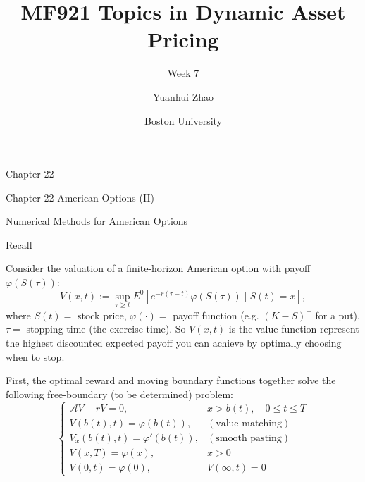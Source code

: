 \documentclass{beamer}
\title{MF921 Topics in Dynamic Asset Pricing}
\subtitle{Week 7}
\author{Yuanhui Zhao}
\date{Boston University}
\begin{document}
\frame{\titlepage}

\begin{frame}{Chapter 22}

    {
    \begin{center}
        Chapter 22 American Options (II)
    \end{center}
    \begin{center}
        Numerical Methods for American Options
    \end{center}
    }
    
\end{frame}

\begin{frame}{Recall}

    {\footnotesize \footnotesize
    Consider the valuation of a finite-horizon American option with payoff $\varphi(S(\tau))$:
    \[
    V(x,t) := \sup_{\tau \geq t} E^0 \left[ e^{-r(\tau - t)} \varphi(S(\tau)) \mid S(t) = x \right],
    \]
     where \( S(t) = \) stock price, \(\varphi(\cdot) = \) payoff function (e.g. \((K - S)^+\) for 
    a put), \(\tau = \) stopping time (the exercise time). So \( V(x,t) \) is the value function
    represent the highest discounted expected payoff you can achieve by optimally choosing when to stop.
    \vspace{1em}

    First, the optimal reward and moving boundary functions together solve the
    following free-boundary (to be determined) problem:
        \[
        \begin{cases}
        \mathcal{A} V - rV = 0, & x > b(t), \quad 0 \leq t \leq T\\
        V(b(t), t) = \varphi(b(t)), & (\text{value matching}) \\
        V_x(b(t), t) = \varphi'(b(t)), & (\text{smooth pasting}) \\
        V(x, T) = \varphi(x), & x > 0 \\
        V(0, t) = \varphi(0), & V(\infty, t) = 0
        \end{cases}
        \]
    }
    
\end{frame}
\end{document}

